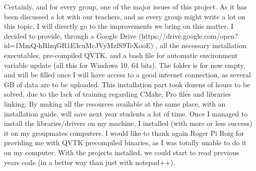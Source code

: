 \documentclass[aps,letterpaper,11pt]{revtex4}
\begin{document}
Certainly, and for every group, one of the major issues of this project. As it has been discussed a lot with our teachers, and as every group might write a lot on this topic, I will directly go to the improvements we bring on this matter. I decided to provide, through a Google Drive  (https://drive.google.com/open?id=1MmQ-hRlzqGR1E3cuMcJVyMzfS9TeXooE) , all the necessary installation executables, pre-compiled QVTK, and a bash file for automatic environment variable update (all this for Windows 10, 64 bits). The folder is for now empty, and will be filled once I will have access to a good internet connection, as several GB of data are to be uploaded. This installation part took dozens of hours to be solved, due to the lack of training regarding CMake, Pro files and libraries linking. By making all the resources available at the same place, with an installation guide, will save next year students a lot of time. Once I managed to install the libraries/drivers on my machine, I installed (with more or less success) it on my groupmates computers. I would like to thank again Roger Pi Roig for providing me with QVTK precompiled binaries, as I was totally unable to do it on my computer.
With the projects installed, we could start to read previous years code (in a better way than just with notepad++).
\end{document}

